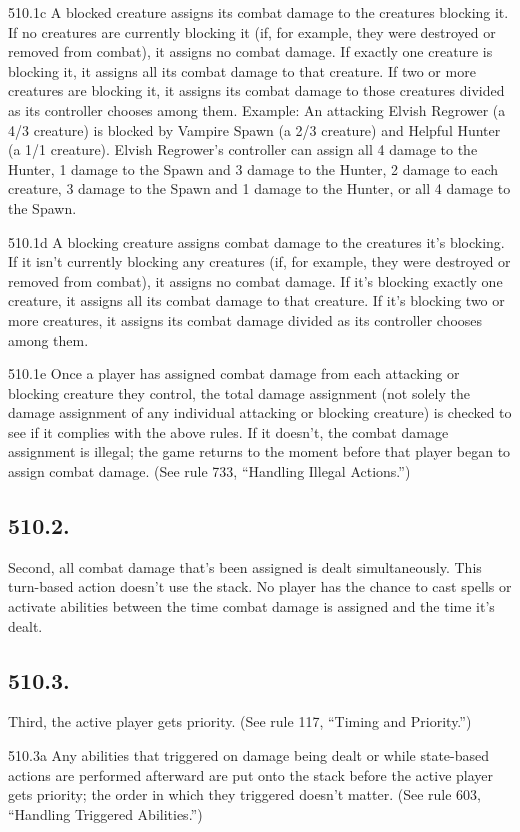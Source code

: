 510.1c A blocked creature assigns its combat damage to the creatures blocking it. If no creatures are currently blocking it (if, for example, they were destroyed or removed from combat), it assigns no combat damage. If exactly one creature is blocking it, it assigns all its combat damage to that creature. If two or more creatures are blocking it, it assigns its combat damage to those creatures divided as its controller chooses among them.
Example: An attacking Elvish Regrower (a 4/3 creature) is blocked by Vampire Spawn (a 2/3 creature) and Helpful Hunter (a 1/1 creature). Elvish Regrower’s controller can assign all 4 damage to the Hunter, 1 damage to the Spawn and 3 damage to the Hunter, 2 damage to each creature, 3 damage to the Spawn and 1 damage to the Hunter, or all 4 damage to the Spawn.

510.1d A blocking creature assigns combat damage to the creatures it’s blocking. If it isn’t currently blocking any creatures (if, for example, they were destroyed or removed from combat), it assigns no combat damage. If it’s blocking exactly one creature, it assigns all its combat damage to that creature. If it’s blocking two or more creatures, it assigns its combat damage divided as its controller chooses among them.

510.1e Once a player has assigned combat damage from each attacking or blocking creature they control, the total damage assignment (not solely the damage assignment of any individual attacking or blocking creature) is checked to see if it complies with the above rules. If it doesn’t, the combat damage assignment is illegal; the game returns to the moment before that player began to assign combat damage. (See rule 733, “Handling Illegal Actions.”)

\subsection*{510.2.}
Second, all combat damage that’s been assigned is dealt simultaneously. This turn-based action doesn’t use the stack. No player has the chance to cast spells or activate abilities between the time combat damage is assigned and the time it’s dealt.

\subsection*{510.3.}
Third, the active player gets priority. (See rule 117, “Timing and Priority.”)

510.3a Any abilities that triggered on damage being dealt or while state-based actions are performed afterward are put onto the stack before the active player gets priority; the order in which they triggered doesn’t matter. (See rule 603, “Handling Triggered Abilities.”)

